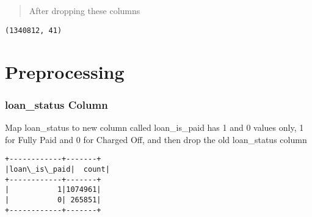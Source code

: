 \documentclass[11pt]{article}
\begin{document}
    \begin{center}
    \end{center}
    { \hspace*{\fill} \\}
    
    \begin{center}
    \end{center}
    { \hspace*{\fill} \\}
    
    \begin{center}
    \end{center}
    { \hspace*{\fill} \\}
    
    \begin{center}
    \end{center}
    { \hspace*{\fill} \\}
    
    \begin{quote}
After dropping these columns
\end{quote}

    \begin{Verbatim}[commandchars=\\\{\}]
(1340812, 41)
    \end{Verbatim}

    \section{Preprocessing}

    \hypertarget{loan_status-column}{%
\subsubsection{loan\_status Column}\label{loan_status-column}}

    Map loan\_status to new column called loan\_is\_paid has 1 and 0 values
only, 1 for Fully Paid and 0 for Charged Off, and then drop the old
loan\_status column

    \begin{Verbatim}[commandchars=\\\{\}]
+------------+-------+
|loan\_is\_paid|  count|
+------------+-------+
|           1|1074961|
|           0| 265851|
+------------+-------+

    \end{Verbatim}
\end{document}
